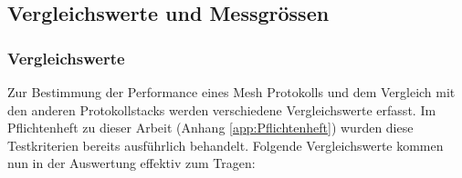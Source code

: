 %
%
%



\subsection{Vergleichswerte und Messgrössen}\label{subsec:VergleichswerteundMessgrössenMesh}

\subsubsection{Vergleichswerte}\label{subsubsec:Vergleichswerte}

Zur Bestimmung der Performance eines Mesh Protokolls und dem Vergleich mit den anderen Protokollstacks werden verschiedene Vergleichswerte erfasst.
Im Pflichtenheft zu dieser Arbeit (Anhang \ref{app:Pflichtenheft}) wurden diese Testkriterien bereits ausführlich behandelt.
Folgende Vergleichswerte kommen nun in der Auswertung effektiv zum Tragen:

